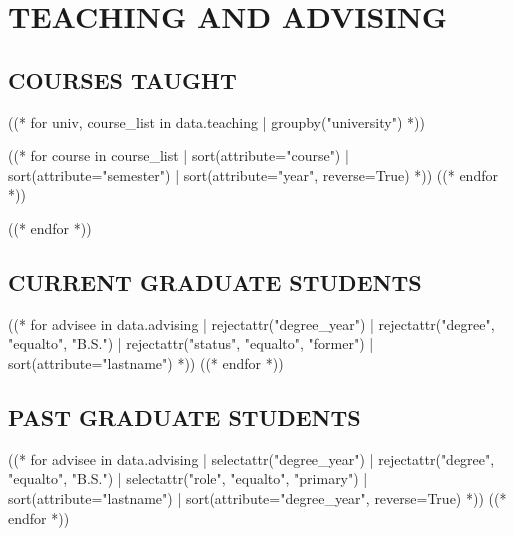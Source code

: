 \section{TEACHING AND ADVISING}

\subsection{COURSES TAUGHT}

((* for univ, course_list in data.teaching | groupby("university") *))
\begin{alignedentrieshang}
((* for course in course_list | sort(attribute="course") | sort(attribute="semester") | sort(attribute="year", reverse=True) *))
((* endfor *))
\end{alignedentrieshang}
((* endfor *))

\subsection{CURRENT GRADUATE STUDENTS}

\begin{alignedentrieshang}
((* for advisee in data.advising | rejectattr("degree_year") | rejectattr("degree", "equalto", "B.S.") | rejectattr("status", "equalto", "former") | sort(attribute="lastname") *))
((* endfor *))
\end{alignedentrieshang}

\subsection{PAST GRADUATE STUDENTS}


\begin{alignedentrieshang}
((* for advisee in data.advising | selectattr("degree_year") | rejectattr("degree", "equalto", "B.S.") | selectattr("role", "equalto", "primary") | sort(attribute="lastname") | sort(attribute="degree_year", reverse=True) *))
((* endfor *))
\end{alignedentrieshang}

